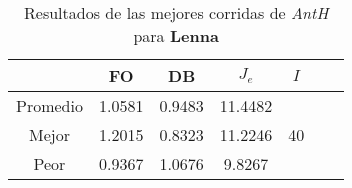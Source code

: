 \begin{table}[h!]
\footnotesize
\begin{center}
\begin{tabular}{|c|c|c|c|c|c|c|}
\hline
& {\bf FO} & {\bf DB}& $J_e$ & $I$\\
\hline
\hline
Promedio   & 1.0581 & 0.9483  & 11.4482 & \\
\cline{1-4}
Mejor & 1.2015 & 0.8323  & 11.2246 & 40\\
\cline{1-4}
Peor & 0.9367 & 1.0676  & 9.8267 & \\\hline
\end{tabular}
\caption{Resultados de las mejores corridas de \emph{AntH} para {\bf Lenna}}
\label{tb:pmpanthibimg}
\end{center}
\end{table}

